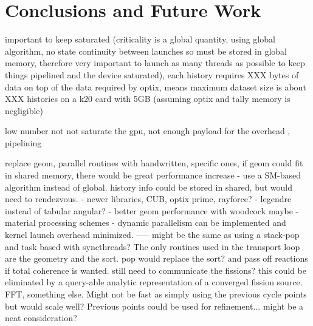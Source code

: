 \chapter{Conclusions and Future Work}
\label{chap:conclusions}

important to keep saturated (criticality is a global quantity, using global algorithm, no state continuity between launches so must be stored in global memory, therefore very important to launch as many threads as possible to keep things pipelined and the device saturated), each history requires XXX bytes of data on top of the data required by optix, means maximum dataset size is about XXX histories on a k20 card with 5GB (assuming optix and tally memory is negligible)

low number not not saturate the gpu, not enough payload for the overhead , pipelining

replace geom, parallel routines with handwritten, specific ones, if geom could fit in shared memory, there would be great performance increase
- use a SM-based algorithm instead of global.  history info could be stored in shared, but would need to rendezvous.
- newer libraries, CUB, optix prime, rayforce?
- legendre instead of tabular angular?
- better geom performance with woodcock maybe
- material processing schemes
- dynamic parallelism can be implemented and kernel launch overhead minimized.  
-----  might be the same as using a stack-pop and task based with syncthreads?  The only routines used in the transport loop are the geometry and the sort.   pop would replace the sort?  and pass off reactions if total coherence is wanted.  still need to communicate the fissions?  this could be eliminated by a query-able analytic representation of a converged fission source.  FFT, something else.  Might not be fast as simply using the previous cycle points but would scale well?  Previous points could be used for refinement...  might be a neat consideration?